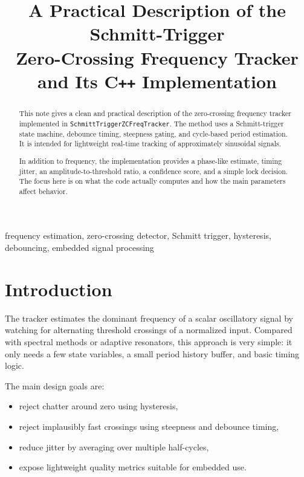 \documentclass[conference]{IEEEtran}
\title{A Practical Description of the Schmitt-Trigger\\
Zero-Crossing Frequency Tracker and Its C\texttt{++} Implementation}
\author{%
    \IEEEauthorblockN{Mikhail S.\ Grushinskiy}
    \IEEEauthorblockA{Independent Researcher\\
    Bareboat Necessities Project\\
    \texttt{mgrouch@users.github.com}}
}
\begin{document}
    \maketitle

    \begin{abstract}
        This note gives a clean and practical description of the zero-crossing
        frequency tracker implemented in \texttt{SchmittTriggerZCFreqTracker}. The
        method uses a Schmitt-trigger state machine, debounce timing, steepness
        gating, and cycle-based period estimation. It is intended for lightweight
        real-time tracking of approximately sinusoidal signals.

        In addition to frequency, the implementation provides a phase-like estimate,
        timing jitter, an amplitude-to-threshold ratio, a confidence score, and a
        simple lock decision. The focus here is on what the code actually computes
        and how the main parameters affect behavior.
    \end{abstract}

    \begin{IEEEkeywords}
        frequency estimation, zero-crossing detector, Schmitt trigger, hysteresis,
        debouncing, embedded signal processing
    \end{IEEEkeywords}

    \section{Introduction}

    The tracker estimates the dominant frequency of a scalar oscillatory signal by
    watching for alternating threshold crossings of a normalized input. Compared
    with spectral methods or adaptive resonators, this approach is very simple:
    it only needs a few state variables, a small period history buffer, and basic
    timing logic.

    The main design goals are:
    \begin{itemize}[leftmargin=1.4em]
        \item reject chatter around zero using hysteresis,
        \item reject implausibly fast crossings using steepness and debounce timing,
        \item reduce jitter by averaging over multiple half-cycles,
        \item expose lightweight quality metrics suitable for embedded use.
    \end{itemize}
\end{document}
